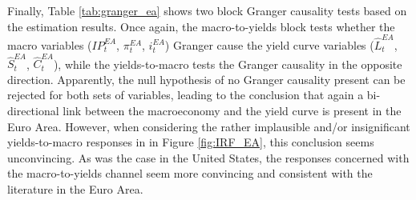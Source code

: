 Finally, Table \ref{tab:granger_ea} shows two block Granger causality tests based on the estimation results. 
Once again, the macro-to-yields block tests whether the macro variables ($IP^{EA}_{t}$, $\pi^{EA}_{t}$, $i^{EA}_{t}$) Granger cause the yield curve variables ($\hat{L}^{EA}_{t}$, $\hat{S}^{EA}_{t}$, $\hat{C}^{EA}_{t}$), while the yields-to-macro tests the Granger causality in the opposite direction. 
Apparently, the null hypothesis of no Granger causality present can be rejected for both sets of variables,
leading to the conclusion that again a bi-directional link between the macroeconomy and the yield curve is present in the Euro Area. 
However, when considering the rather implausible and/or insignificant yields-to-macro responses in in Figure \ref{fig:IRF_EA}, this conclusion seems unconvincing. 
As was the case in the United States, the responses concerned with the macro-to-yields channel seem more convincing and consistent with the literature in the Euro Area. 





